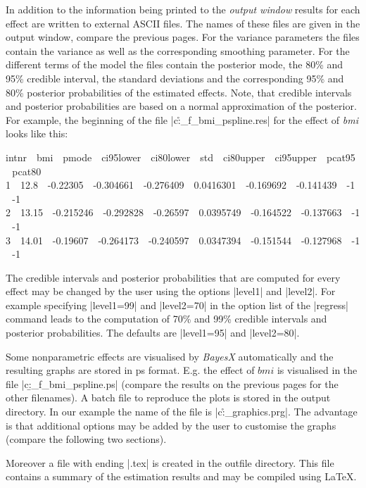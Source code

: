 \documentclass[a4paper]{article}
\begin{document}
In addition to the information being printed to the {\em output
window} results for each effect are written to external ASCII
files. The names of these files are given in the output window,
compare the previous pages. For the variance parameters the files
contain the variance as well as the corresponding smoothing
parameter. For the different terms of the model the files contain
the posterior mode, the 80\% and 95\% credible interval, the
standard deviations and the corresponding 95\% and 80\% posterior
probabilities of the estimated effects. Note, that credible
intervals and posterior probabilities are based on a normal
approximation of the posterior. For example, the beginning of the
file |c:\data\r_f_bmi_pspline.res| for the effect of {\em bmi}
looks like this:

{\footnotesize
 intnr \,\, bmi \,\, pmode \,\, ci95lower \,\, ci80lower \,\, std \,\, ci80upper \,\, ci95upper \,\, pcat95 \,\, pcat80\\
 1 \,\, 12.8 \,\, -0.22305 \,\, -0.304661 \,\, -0.276409 \,\, 0.0416301 \,\, -0.169692 \,\, -0.141439 \,\, -1 \,\, -1\\
 2 \,\, 13.15 \,\, -0.215246 \,\, -0.292828 \,\, -0.26597 \,\, 0.0395749 \,\, -0.164522 \,\, -0.137663 \,\, -1 \,\, -1\\
 3 \,\, 14.01 \,\, -0.19607 \,\, -0.264173 \,\, -0.240597 \,\, 0.0347394 \,\, -0.151544 \,\, -0.127968 \,\, -1 \,\, -1\\}

The credible intervals and posterior probabilities that are
computed for every effect may be changed by the user using the
options |level1| and |level2|. For example specifying |level1=99|
and |level2=70| in the option list of the |regress| command leads
to the computation of 70\% and 99\% credible intervals and
posterior probabilities. The defaults are |level1=95| and
|level2=80|.

Some nonparametric effects are visualised by {\em BayesX}
automatically and the resulting graphs are stored in ps format.
E.g. the effect of $bmi$ is visualised in the file
|c:\data\b_f_bmi_pspline.ps| (compare the results on the previous
pages for the other filenames). A batch file to reproduce the
plots is stored in the output directory. In our example the name
of the file is |c:\data\r_graphics.prg|. The advantage is that
additional options may be added by the user to customise the
graphs (compare the following two sections).

Moreover a file with ending |.tex| is created in the outfile
directory. This file contains a summary of the estimation results
and may be compiled using \LaTeX.
\end{document}
